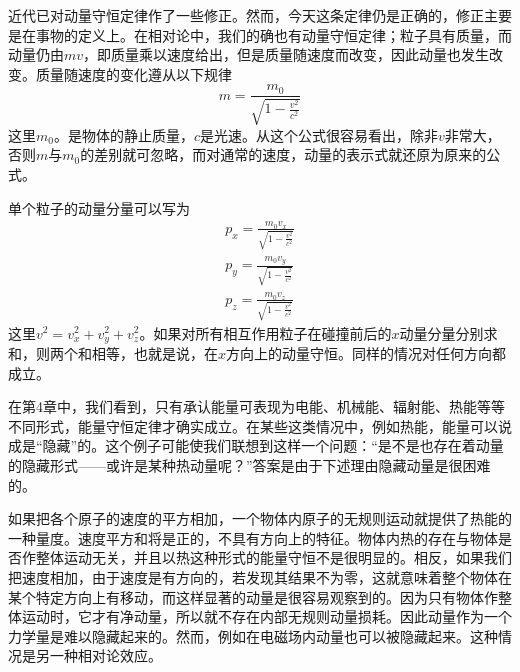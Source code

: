 近代已对动量守恒定律作了一些修正。然而，今天这条定律仍是正确的，修正主要是在事物的定义上。在相对论中，我们的确也有动量守恒定律；粒子具有质量，而动量仍由$mv$，即质量乘以速度给出，但是质量随速度而改变，因此动量也发生改变。质量随速度的变化遵从以下规律
\begin{equation}
    \label{Eq:I:10:7}
    m=\frac{m_0}{\sqrt{1-\frac{v^2}{c^2}}}
\end{equation}
这里$m_0$。是物体的静止质量，$c$是光速。从这个公式很容易看出，除非$v$非常大，否则$m$与$m_0$的差别就可忽略，而对通常的速度，动量的表示式就还原为原来的公式。

单个粒子的动量分量可以写为
\begin{equation}
    \label{Eq:I:10:8}
    \begin{split}
        p_x=\frac{m_0v_x}{\sqrt{1-\frac{v^2}{c^2}}} \\
        p_y=\frac{m_0v_y}{\sqrt{1-\frac{v^2}{c^2}}} \\
        p_z=\frac{m_0v_z}{\sqrt{1-\frac{v^2}{c^2}}}
    \end{split}
\end{equation}
这里$v^2=v^2_x+v^2_y+v^2_z$。如果对所有相互作用粒子在碰撞前后的$x$动量分量分别求和，则两个和相等，也就是说，在$x$方向上的动量守恒。同样的情况对任何方向都成立。

在第4章中，我们看到，只有承认能量可表现为电能、机械能、辐射能、热能等等不同形式，能量守恒定律才确实成立。在某些这类情况中，例如热能，能量可以说成是“隐藏”的。这个例子可能使我们联想到这样一个问题：“是不是也存在着动量的隐藏形式——或许是某种热动量呢？”答案是由于下述理由隐藏动量是很困难的。

如果把各个原子的速度的平方相加，一个物体内原子的无规则运动就提供了热能的一种量度。速度平方和将是正的，不具有方向上的特征。物体内热的存在与物体是否作整体运动无关，并且以热这种形式的能量守恒不是很明显的。相反，如果我们把速度相加，由于速度是有方向的，若发现其结果不为零，这就意味着整个物体在某个特定方向上有移动，而这样显著的动量是很容易观察到的。因为只有物体作整体运动时，它才有净动量，所以就不存在内部无规则动量损耗。因此动量作为一个力学量是难以隐藏起来的。然而，例如在电磁场内动量也可以被隐藏起来。这种情况是另一种相对论效应。

